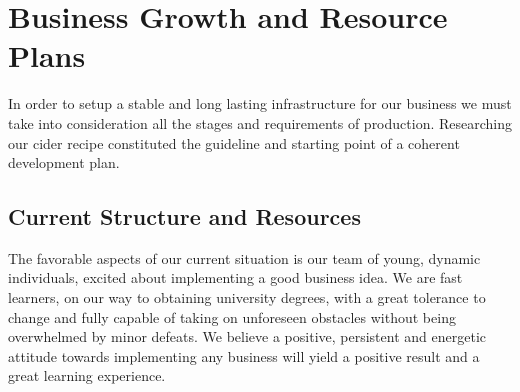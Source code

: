 \documentclass[11pt]{article}
\begin{document}
\newpage
\section{Business Growth and Resource Plans}
In order to setup a stable and long lasting infrastructure for our business we must take into consideration all the stages and requirements of production. Researching our cider recipe constituted the guideline and starting point of a coherent development plan.

  \subsection{Current Structure and Resources}
The favorable aspects of our current situation is our team of young, dynamic individuals, excited about implementing a good business idea. We are fast learners, on our way to obtaining university degrees, with a great tolerance to change and fully capable of taking on unforeseen obstacles without being overwhelmed by minor defeats. We believe a positive, persistent and energetic attitude towards implementing any business will yield a positive result and a great learning experience.
\end{document}
